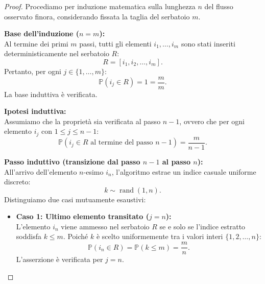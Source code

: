 \begin{proof}
Procediamo per induzione matematica sulla lunghezza $n$ del flusso osservato finora, considerando fissata la taglia del serbatoio $m$.

\textbf{Base dell'induzione ($n = m$):}\\
Al termine dei primi $m$ passi, tutti gli elementi $i_1, \dots, i_m$ sono stati inseriti deterministicamente nel serbatoio $R$:
\begin{equation}
  R = [i_1, i_2, \dots, i_m].
\end{equation}
Pertanto, per ogni $j \in \{1, \dots, m\}$:
\begin{equation}
  \mathbb{P}(i_j \in R) = 1 = \frac{m}{m}.
\end{equation}
La base induttiva è verificata.

\textbf{Ipotesi induttiva:}\\
Assumiamo che la proprietà sia verificata al passo $n - 1$, ovvero che per ogni elemento $i_j$ con $1 \le j \le n - 1$:
\begin{equation}
  \mathbb{P}(i_j \in R \text{ al termine del passo } n - 1) = \frac{m}{n - 1}.
  \label{eq:induction-hypothesis}
\end{equation}

\textbf{Passo induttivo (transizione dal passo $n - 1$ al passo $n$):}\\
All'arrivo dell'elemento $n$-esimo $i_n$, l'algoritmo estrae un indice casuale uniforme discreto:
\begin{equation}
  k \sim \operatorname{rand}(1, n).
\end{equation}
Distinguiamo due casi mutuamente esaustivi:
\begin{itemize}
  \item \textbf{Caso 1: Ultimo elemento transitato ($j = n$):}\\
  L'elemento $i_n$ viene ammesso nel serbatoio $R$ se e solo se l'indice estratto soddisfa $k \le m$. Poiché $k$ è scelto uniformemente tra i valori interi $\{1, 2, \dots, n\}$:
  \begin{equation}
    \mathbb{P}(i_n \in R) = \mathbb{P}(k \le m) = \frac{m}{n}.
  \end{equation}
  L'asserzione è verificata per $j = n$.


\end{itemize}
\end{proof}
